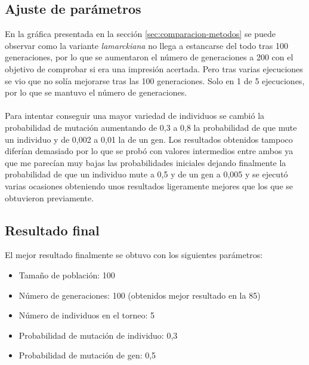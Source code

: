 \subsection{Ajuste de parámetros}

En la gráfica presentada en la sección \ref{sec:comparacion-metodos} se puede observar como la variante \textit{lamarckiana} no llega a estancarse del todo tras 100 generaciones, por lo que se aumentaron el número de generaciones a 200 con el objetivo de comprobar si era una impresión acertada. Pero tras varias ejecuciones se vio que no solía mejorarse tras las 100 generaciones. Solo en 1 de 5 ejecuciones, por lo que se mantuvo el número de generaciones.
\\ \\
Para intentar conseguir una mayor variedad de individuos se cambió la probabilidad de mutación aumentando de 0,3 a 0,8 la probabilidad de que mute un individuo y de 0,002 a 0,01 la de un gen. Los resultados obtenidos tampoco diferían demasiado por lo que se probó con valores intermedios entre ambos ya que me parecían muy bajas las probabilidades iniciales dejando finalmente la probabilidad de que un individuo mute a 0,5 y de un gen a 0,005 y se ejecutó varias ocasiones obteniendo unos resultados ligeramente mejores que los que se obtuvieron previamente.

\subsection{Resultado final}

El mejor resultado finalmente se obtuvo con los siguientes parámetros:

\begin{itemize}
	\item Tamaño de población: 100
	\item Número de generaciones: 100 (obtenidos mejor resultado en la 85)
	\item Número de individuos en el torneo: 5
	\item Probabilidad de mutación de individuo: 0,3
	\item Probabilidad de mutación de gen: 0,5
\end{itemize}

